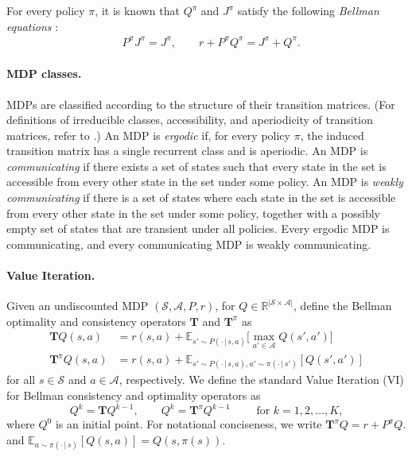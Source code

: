 \documentclass{article}
\theoremstyle{definition}
\theoremstyle{remark}
\newcommand{\real}{\mathbb{R}}
\newcommand{\cA}{\mathcal{A}}
\newcommand{\cS}{\mathcal{S}}
\newcommand{\cM}{\mathcal{M}}
\newcommand{\T}{\mathbf{T}}
\newcommand{\cX}{\mathcal{X}}
\begin{document}
For every policy $\pi$, it is known that $Q^\pi$ and $ J^\pi$ satisfy the following \emph{Bellman equations} \citep[Theorem~8.2.6] {Puterman2014}:    
\begin{align*}
  &P^\pi J^\pi=J^\pi , \qquad r+ P^\pi Q^\pi = J^\pi+Q^\pi.
\end{align*} 

\paragraph{MDP classes.}
 MDPs are classified according to the structure of their transition matrices. 
(For definitions of irreducible classes, accessibility, and aperiodicity of transition matrices, refer to \cite[Appendix A.2]{Puterman2014}.)
%
%
An MDP is \emph{ergodic} if, for every policy $\pi$, the induced transition matrix has a single recurrent class and is aperiodic. An MDP is \emph{communicating} if there exists a set of states such that every state in the set is accessible from every other state in the set under some policy. An MDP is \emph{weakly communicating} if there is a set of states where each state in the set is accessible from every other state in the set under some policy, together with a possibly empty set of states that are transient under all policies. Every ergodic MDP is communicating, and every communicating MDP is weakly communicating. 
  
  
\paragraph{Value Iteration.}
Given an undiscounted MDP $(\cS, \cA, P, r)$, for $Q \in \real^{|\cS \times \cA|}$, define the Bellman optimality and consistency operators $\T$ and  $\T^\pi$ as
\begin{align*}
\T Q(s,a)&=r(s,a)+\mathbb{E}_{s'\sim P(\cdot\,|\,s,a)}\Big[\max_{a' \in \cA} Q(s',a')\Big]
\\\T^\pi Q(s,a)&=r(s,a)+\mathbb{E}_{s'\sim P(\cdot\,|\,s,a), a' \sim \pi(\cdot \,|\, s')}[ Q(s',a')]
\end{align*}
for all $s \in \cS$ and $a \in \cA$, respectively.
We define the standard Value Iteration (VI) for Bellman consistency and optimality operators as
\[ Q^{k}=\T Q^{k-1}, \qquad  Q^{k}=\T^\pi Q^{k-1} \qquad\text{ for } k=1,2,\dots,K,
\]
 where $Q^0$ is an initial point.   For notational conciseness, we write $\T^{\pi}Q=r+P^{\pi}Q $.
and $ \mathbb{E}_{ a \sim \pi(\cdot \,|\, s)}[ Q(s,a)]=Q (s, \pi(s))$. 
\end{document}

